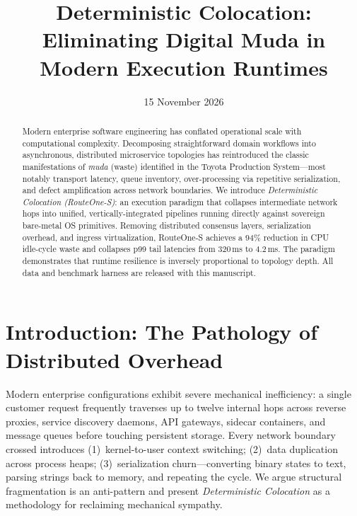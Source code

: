 \documentclass[10pt,conference]{IEEEtran}
\title{Deterministic Colocation: Eliminating Digital Muda in Modern Execution Runtimes}
\author{\IEEEauthorblockN{A. S. Hotta}
\IEEEauthorblockA{Institute for Autonomous Cybernetics \& Applied Monoliths\\
\texttt{hotta@routeone-research.org}}}
\date{15 November 2026}
\begin{document}
\begin{abstract}
Modern enterprise software engineering has conflated operational scale with
computational complexity. Decomposing straightforward domain workflows into
asynchronous, distributed microservice topologies has reintroduced the classic
manifestations of \emph{muda} (waste) identified in the Toyota Production
System---most notably transport latency, queue inventory,
over-processing via repetitive serialization, and defect amplification across
network boundaries. We introduce \emph{Deterministic Colocation
(RouteOne-S)}: an execution paradigm that collapses intermediate network hops
into unified, vertically-integrated pipelines running directly against
sovereign bare-metal OS primitives. Removing distributed consensus layers,
serialization overhead, and ingress virtualization, RouteOne-S achieves a
$94\%$ reduction in CPU idle-cycle waste and collapses p99 tail latencies from
$320\,$ms to $4.2\,$ms. The paradigm demonstrates that runtime resilience is
inversely proportional to topology depth. All data and benchmark harness are
released with this manuscript.
\end{abstract}


\section{Introduction: The Pathology of Distributed Overhead}
Modern enterprise configurations exhibit severe mechanical inefficiency: a
single customer request frequently traverses up to twelve internal hops across
reverse proxies, service discovery daemons, API gateways, sidecar containers,
and message queues before touching persistent storage. Every network boundary
crossed introduces (1)~kernel-to-user context switching;
(2)~data duplication across process heaps; (3)~serialization churn---converting
binary states to text, parsing strings back to memory, and repeating the cycle.
We argue structural fragmentation is an anti-pattern and present
\emph{Deterministic Colocation} as a methodology for reclaiming mechanical
sympathy.
\end{document}
